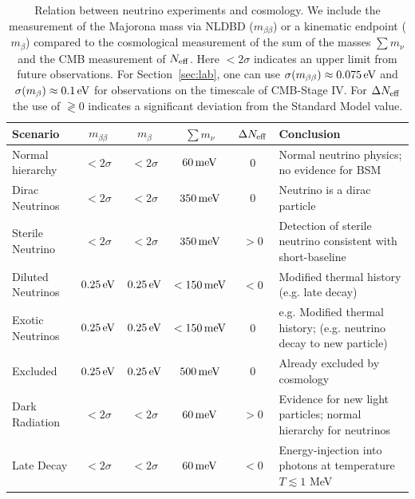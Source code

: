 \begin{table}[t!]
\begin{center}
\begin{tabular}
{| l | c c c c | p{5cm} | }\hline Scenario & $m_{\beta \beta}$ & $m_{\beta}$&  $\sum m_\nu$ & $\Delta N_{\rm eff}$ & Conclusion \\
\hline 
Normal hierarchy & $< 2\sigma$ & $< 2\sigma$  & $60 \, {\rm meV}$ & 0 & Normal neutrino physics; no evidence for BSM
\\[.2cm]
Dirac Neutrinos & $< 2\sigma$ & $< 2\sigma$  & $350  \, {\rm meV}$ & 0 & Neutrino is a dirac particle \\[.2cm]
Sterile Neutrino & $< 2\sigma$ & $< 2\sigma$   & $350  \, {\rm meV}$ & $>0$ & Detection of sterile neutrino consistent with short-baseline \\
\hline
Diluted Neutrinos & $ 0.25 \, {\rm eV}$ & $ 0.25 \, {\rm eV}$  & $<150  \, {\rm meV}$ & $< 0$ & Modified thermal history (e.g. late decay) \\[.2cm]
Exotic Neutrinos & $ 0.25 \, {\rm eV}$ & $ 0.25 \, {\rm eV}$  & $<150  \, {\rm meV}$ & $0$ & e.g. Modified thermal history; (e.g. neutrino decay to new particle) \\[.2cm]
Excluded & $ 0.25 \, {\rm eV}$ & $ 0.25 \, {\rm eV}$  & $500  \, {\rm meV}$ & $0$ & Already excluded by cosmology \\
\hline
Dark Radiation & $< 2\sigma$ & $< 2\sigma$  & $60  \, {\rm meV}$ & $>0$ & Evidence for new light particles; normal hierarchy for neutrinos
\\[.2cm]
Late Decay & $< 2\sigma$ & $< 2\sigma$  & $60  \, {\rm meV}$ & $<0$ & Energy-injection into photons at temperature $T \lesssim 1$ MeV \\
\hline 
\end{tabular}
\caption{Relation between neutrino experiments and cosmology.  We include the measurement of the Majorona mass via NLDBD ($m_{\beta \beta}$) or a kinematic endpoint ($m_\beta$) compared to the cosmological measurement of the sum of the masses $\sum m_\nu$ and the CMB measurement of $N_{\rm eff}$.  Here $< 2 \sigma$ indicates an upper limit from future observations.  For Section~\ref{sec:lab}, one can use $\sigma(m_{\beta\beta}) \approx 0.075 \, {\rm eV} $ and $\sigma(m_\beta) \approx 0.1 \, {\rm eV} $ for observations on the timescale of CMB-Stage IV.  For $\Delta N_{\rm eff}$ the use of $\gtrless 0$ indicates a significant deviation from the Standard Model value.}
\label{table:neutrinoscenarios}
\end{center}
\end{table} 


